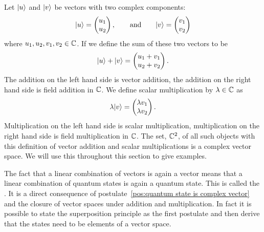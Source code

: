     \begin{example}
        Let \(\vert {u} \rangle\) and \(\vert {v} \rangle\) be vectors with two complex components:
        \[
            \vert {u} \rangle =
            \begin{pmatrix}
                u_1\\ u_2
            \end{pmatrix}
            ,\qquad\text{and}\qquad\vert {v} \rangle = 
            \begin{pmatrix}
                v_1\\ v_2
            \end{pmatrix}
        \]
        where \(u_1, u_2, v_1, v_2\in\mathbb{C}\).
        If we define the sum of these two vectors to be
        \[
            \vert {u} \rangle + \vert {v} \rangle = 
            \begin{pmatrix}
                u_1 + v_1\\ u_2 + v_2
            \end{pmatrix}
            .
        \]
        The addition on the left hand side is vector addition, the addition on the right hand side is field addition in \(\mathbb{C}\).
        We define scalar multiplication by \(\lambda\in\mathbb{C}\) as
        \[
            \lambda\vert {v} \rangle =
            \begin{pmatrix}
                \lambda v_1\\ \lambda v_2
            \end{pmatrix}
            .
        \]
        Multiplication on the left hand side is scalar multiplication, multiplication on the right hand side is field multiplication in \(\mathbb{C}\).
        The set, \(\mathbb{C}^2\), of all such objects with this definition of vector addition and scalar multiplications is a complex vector space.
        We will use this throughout this section to give examples.
    \end{example}
    The fact that a linear combination of vectors is again a vector means that a linear combination of quantum states is again a quantum state.
    This is called the .
    It is a direct consequence of postulate~\ref{pos:quantum state is complex vector} and the closure of vector spaces under addition and multiplication.
    In fact it is possible to state the superposition principle as the first postulate and then derive that the states need to be elements of a vector space.
    
